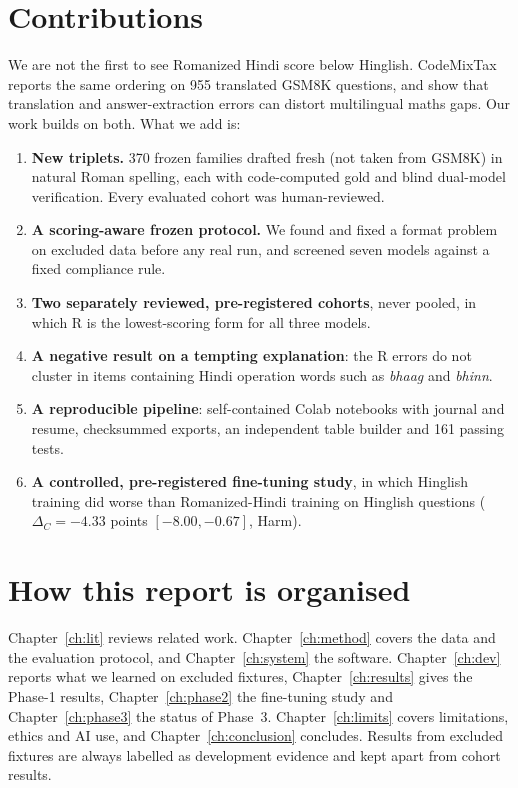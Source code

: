 \documentclass[12pt,a4paper,oneside]{report}
\renewcommand{\_}{\oldunderscore\allowbreak}
\begin{document}
\section{Contributions}

We are not the first to see Romanized Hindi score below Hinglish. CodeMixTax~\citep{sthanika-2026-codemix} reports the same ordering on 955 translated GSM8K questions, and \citet{peter-etal-2026-mind} show that translation and answer-extraction errors can distort multilingual maths gaps. Our work builds on both. What we add is:
\begin{enumerate}
\item \textbf{New triplets.} 370 frozen families drafted fresh (not taken from GSM8K) in natural Roman spelling, each with code-computed gold and blind dual-model verification. Every evaluated cohort was human-reviewed.
\item \textbf{A scoring-aware frozen protocol.} We found and fixed a format problem on excluded data before any real run, and screened seven models against a fixed compliance rule.
\item \textbf{Two separately reviewed, pre-registered cohorts}, never pooled, in which R is the lowest-scoring form for all three models.
\item \textbf{A negative result on a tempting explanation}: the R errors do not cluster in items containing Hindi operation words such as \emph{bhaag} and \emph{bhinn}.
\item \textbf{A reproducible pipeline}: self-contained Colab notebooks with journal and resume, checksummed exports, an independent table builder and 161 passing tests.
\item \textbf{A controlled, pre-registered fine-tuning study}, in which Hinglish training did worse than Romanized-Hindi training on Hinglish questions ($\Delta_C = -4.33$ points $[-8.00, -0.67]$, Harm).
\end{enumerate}

\section{How this report is organised}

Chapter~\ref{ch:lit} reviews related work. Chapter~\ref{ch:method} covers the data and the evaluation protocol, and Chapter~\ref{ch:system} the software. Chapter~\ref{ch:dev} reports what we learned on excluded fixtures, Chapter~\ref{ch:results} gives the Phase-1 results, Chapter~\ref{ch:phase2} the fine-tuning study and Chapter~\ref{ch:phase3} the status of Phase~3. Chapter~\ref{ch:limits} covers limitations, ethics and AI use, and Chapter~\ref{ch:conclusion} concludes. Results from excluded fixtures are always labelled as development evidence and kept apart from cohort results.
\end{document}
